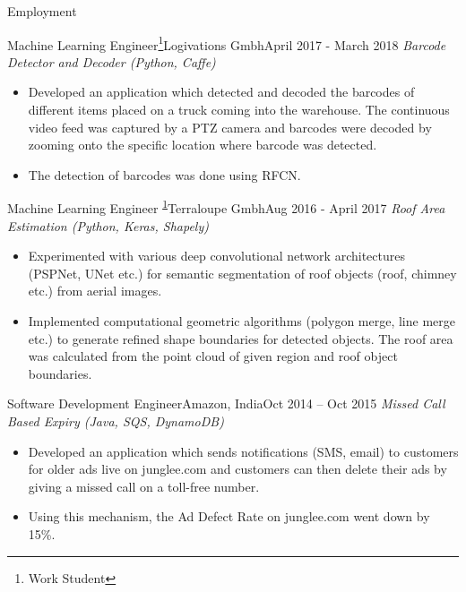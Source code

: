 \documentclass[]{mcdowellcv}
\begin{document}
\begin{cvsection}{Employment}
\begin{cvsubsection}{Machine Learning Engineer\footnote{Work Student\label{ws}}}{Logivations Gmbh}{April 2017 - March 2018}
            \textit{Barcode Detector and Decoder (Python, Caffe)}
            \begin{itemize}
                \item Developed an application which detected and decoded the barcodes of different items placed on a truck coming into the warehouse. The continuous video feed was captured by a PTZ camera and barcodes were decoded by zooming onto the specific location where barcode was detected.
                \item The detection of barcodes was done using RFCN.
            \end{itemize}
            
        \end{cvsubsection}
        
        \begin{cvsubsection}{Machine Learning Engineer \textsuperscript{\ref{ws}}}{Terraloupe Gmbh}{Aug 2016 - April 2017}
            \textit{Roof Area Estimation (Python, Keras, Shapely)}
            \begin{itemize}
                \item Experimented with various deep convolutional network architectures (PSPNet, UNet etc.) for semantic segmentation of roof objects (roof, chimney etc.) from aerial images.
                \item Implemented computational geometric algorithms (polygon merge, line merge etc.) to generate refined shape boundaries for detected objects. The roof area was calculated from the point cloud of given region and roof object boundaries.
            \end{itemize}
        \end{cvsubsection}

  \newpage        
          
        \begin{cvsubsection}{Software Development Engineer}{Amazon, India}{Oct 2014 -- Oct 2015}        
        \textit{Missed Call Based Expiry (Java, SQS, DynamoDB)}
            \begin{itemize}
                \item Developed an application which sends notifications (SMS, email) to customers for older ads live on junglee.com and customers can then delete their ads by giving a missed call on a toll-free number. 
                \item Using this mechanism, the Ad Defect Rate on junglee.com went down by 15\%.
            \end{itemize}
        \end{cvsubsection}


\end{cvsection}
\end{document}
